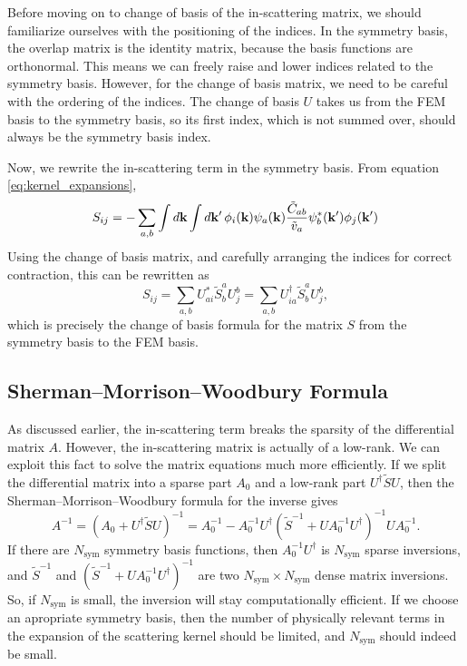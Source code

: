 \documentclass[12pt]{article}
\begin{document}
Before moving on to change of basis of the in-scattering matrix, we should familiarize ourselves
with the positioning of the indices. In the symmetry basis, the overlap matrix is the identity
matrix, because the basis functions are orthonormal. This means we can freely raise and lower
indices related to the symmetry basis. However, for the change of basis matrix, we need to be
careful with the ordering of the indices. The change of basis $U$ takes us from the FEM basis
to the symmetry basis, so its first index, which is not summed over, should always be the
symmetry basis index.

Now, we rewrite the in-scattering term in the symmetry basis. From equation
\eqref{eq:kernel_expansions},
\begin{equation}
    S_{ij} = -\sum_{a,b} \int\dd{\vb{k}} \int\dd{\vb{k'}}\phi_i(\vb{k})\psi_a(\vb{k})
    \frac{\tilde{C}_{ab}}{\tilde{v}_a}\psi_b^*(\vb{k'})\phi_j(\vb{k'})
\end{equation}
Using the change of basis matrix, and carefully arranging the indices for correct contraction,
this can be rewritten as
\begin{equation}
    S_{ij} = \sum_{a,b} U^*_{ai} \tilde{S}^a_b U^b_j
    = \sum_{a,b} U^\dagger_{ia} \tilde{S}^a_b U^b_j,
\end{equation}
which is precisely the change of basis formula for the matrix $S$ from the symmetry basis to
the FEM basis.

\subsection{Sherman--Morrison--Woodbury Formula}
As discussed earlier, the in-scattering term breaks the sparsity of the differential matrix $A$.
However, the in-scattering matrix is actually of a low-rank. We can exploit this fact to solve
the matrix equations much more efficiently. If we split the differential matrix into a sparse
part $A_0$ and a low-rank part $U^\dagger \tilde{S} U$, then the Sherman--Morrison--Woodbury
formula for the inverse gives
\begin{equation}
    A^{-1} = (A_0 + U^\dagger \tilde{S} U)^{-1}
    = A_0^{-1} - A_0^{-1} U^\dagger (\tilde{S}^{-1} + U A_0^{-1} U^\dagger)^{-1} U A_0^{-1}.
\end{equation}
If there are $N_{\text{sym}}$ symmetry basis functions, then $A_0^{-1} U^{\dagger}$ is
$N_{\text{sym}}$ sparse inversions, and $\tilde{S}^{-1}$ and
$(\tilde{S}^{-1} + U A_0^{-1} U^\dagger)^{-1}$ are two $N_{\text{sym}}\times N_{\text{sym}}$
dense matrix inversions. So, if $N_{\text{sym}}$ is small, the inversion will stay
computationally efficient. If we choose an apropriate symmetry basis, then the number of
physically relevant terms in the expansion of the scattering kernel should be limited, and
$N_{\text{sym}}$ should indeed be small.
\end{document}
